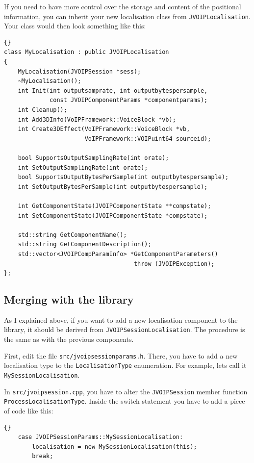 			If you need to have more control over the storage and content of the positional
			information, you can inherit your new localisation class from {\tt JVOIPLocalisation}.
			Your class would then look something like this:
			\begin{lstlisting}[frame=tb]{}
class MyLocalisation : public JVOIPLocalisation
{
	MyLocalisation(JVOIPSession *sess);
	~MyLocalisation();
	int Init(int outputsamprate, int outputbytespersample, 
	         const JVOIPComponentParams *componentparams);
	int Cleanup();
	int Add3DInfo(VoIPFramework::VoiceBlock *vb);
	int Create3DEffect(VoIPFramework::VoiceBlock *vb,
	                   VoIPFramework::VOIPuint64 sourceid);
	
	bool SupportsOutputSamplingRate(int orate);
	int SetOutputSamplingRate(int orate);
	bool SupportsOutputBytesPerSample(int outputbytespersample);
	int SetOutputBytesPerSample(int outputbytespersample);
	
	int GetComponentState(JVOIPComponentState **compstate);
	int SetComponentState(JVOIPComponentState *compstate);
	
	std::string GetComponentName();
	std::string GetComponentDescription();
	std::vector<JVOIPCompParamInfo> *GetComponentParameters() 
	                                 throw (JVOIPException);
};
			\end{lstlisting}

		\subsection{Merging with the library}

		As I explained above, if you want to add a new localisation component to
		the library, it should be derived from {\tt JVOIPSessionLocalisation}.
		The procedure is the same as with the previous components.
		
		First, edit the file {\tt src/jvoipsessionparams.h}. There, you have to
		add a new localisation type to the {\tt LocalisationType} enumeration.
		For example, lets call it {\tt My\-Session\-Loca\-li\-sa\-tion}.
		
		In {\tt src/jvoipsession.cpp}, you have to alter the {\tt JVOIPSession}
		member function {\tt ProcessLocalisationType}. Inside the switch statement
		you have to add a piece of code like this:
		\begin{lstlisting}[frame=tb]{}
	case JVOIPSessionParams::MySessionLocalisation:
		localisation = new MySessionLocalisation(this);
		break;                                                          
		\end{lstlisting}

